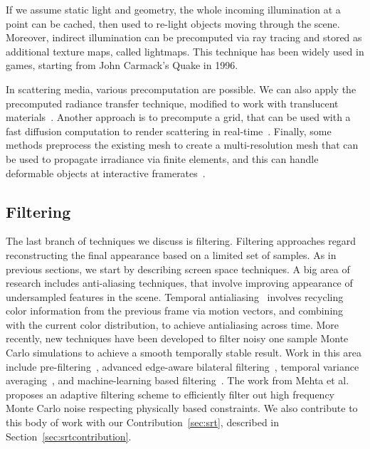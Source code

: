 If we assume static light and geometry, the whole incoming illumination at a point can be cached, then used to re-light objects moving through the scene. Moreover, indirect illumination can be precomputed via ray tracing and stored as additional texture maps, called lightmaps. This technique has been widely used in games, starting from John Carmack's Quake in 1996.    

In scattering media, various precomputation are possible. We can also apply the precomputed radiance transfer technique, modified to work with translucent materials~\cite{Sloan2003}. Another approach is to precompute a grid, that can be used with a fast diffusion computation to render scattering in real-time~\cite{Wang2008a}. Finally, some methods preprocess the existing mesh to create a multi-resolution mesh that can be used to propagate irradiance via finite elements, and this can handle deformable objects at interactive framerates~\cite{Mertens2003, Li2013}. 

\subsection{Filtering}

The last branch of techniques we discuss is filtering. Filtering approaches regard reconstructing the final appearance based on a limited set of samples. As in previous sections, we start by describing screen space techniques. A big area of research includes anti-aliasing techniques, that involve improving appearance of undersampled features in the scene. Temporal antialiasing~\cite{Karis2014,Patney2016} involves recycling color information from the previous frame via motion vectors, and combining with the current color distribution, to achieve antialiasing across time. More recently, new techniques have been developed to filter noisy one sample Monte Carlo simulations to achieve a smooth temporally stable result. Work in this area include pre-filtering~\cite{Crassin2015}, advanced edge-aware bilateral filtering~\cite{Mara2017}, temporal variance averaging~\cite{Schied17}, and machine-learning based filtering~\cite{Chaitanya2017}. The work from Mehta et al.~\cite{Mehta2013} proposes an adaptive filtering scheme to efficiently filter out high frequency Monte Carlo noise respecting physically based constraints. We also contribute to this body of work with our Contribution~\ref{sec:srt}, described in Section~\ref{sec:srtcontribution}.


